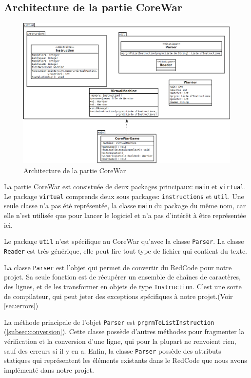 \documentclass[hidelinks]{report}
\begin{document}
\subsection{Architecture de la partie CoreWar}


\begin{figure}[ht]
    \includegraphics[scale=0.5]{images/diagrammes/partieCW.png}
    \caption{Architecture de la partie CoreWar}
    \label{fig:my_label}
\end{figure}

La partie CoreWar est consistuée de deux packages principaux: \texttt{main} et \texttt{virtual}. Le package \texttt{virtual} comprends deux sous packages: \texttt{instructions} et \texttt{util}. Une seule classe n'a pas été représentée, la classe \texttt{main} du package du même nom, car elle n'est utilisée que pour lancer le logiciel et n'a pas d'intérêt à être représentée ici.

Le package \texttt{util} n'est spécifique au CoreWar qu'avec la classe \texttt{Parser}. La classe \texttt{Reader} est très générique, elle peut lire tout type de fichier qui contient du texte.

La classe \texttt{Parser} est l'objet qui permet de convertir du RedCode pour notre projet. Sa seule fonction est de récupérer un ensemble de chaînes de caractères, des lignes, et de les transformer en objets de type \texttt{Instruction}. C'est une sorte de compilateur, qui peut jeter des exceptions spécifiques à notre projet.(Voir \autoref{sec:errors})

La méthode principale de l'objet \texttt{Parser} est \texttt{prgrmToListInstruction} (\autoref{subsec:conversion}). Cette classe possède d'autres méthodes pour fragmenter la vérification et la conversion d'une ligne, qui pour la plupart ne renvoient rien, sauf des erreurs si il y en a. Enfin, la classe \texttt{Parser} possède des attributs statiques qui représentent les éléments existants dans le RedCode que nous avons implémenté dans notre projet. 
\end{document}
